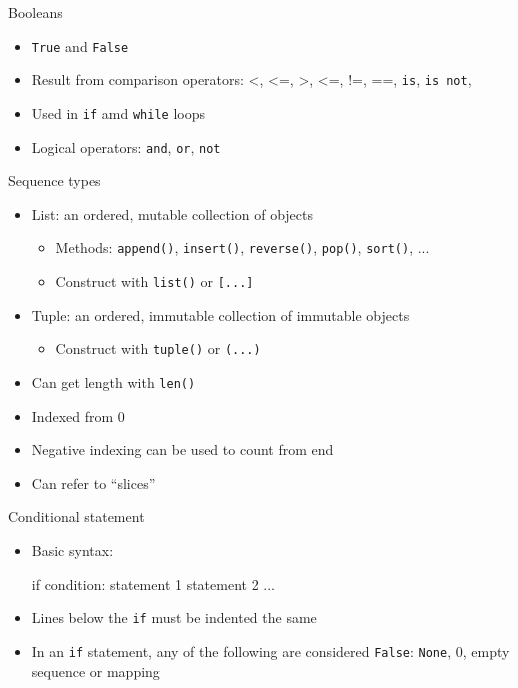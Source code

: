 \documentclass[noamssymb,svgnames]{beamer}
\begin{document}
\begin{frame}{Booleans}
  \begin{itemize}
  \item \texttt{True} and \texttt{False}
  \item Result from comparison operators: <, <=, >, <=, !=, ==, \texttt{is},
    \texttt{is not},
  \item Used in \texttt{if} amd \texttt{while} loops
  \item Logical operators: \texttt{and}, \texttt{or}, \texttt{not}
  \end{itemize}
\end{frame}

\begin{frame}{Sequence types}
  \begin{itemize}
  \item List: an ordered, mutable collection of objects
    \begin{itemize}
    \item Methods: \texttt{append()}, \texttt{insert()}, \texttt{reverse()},
      \texttt{pop()}, \texttt{sort()}, ...
    \item Construct with \texttt{list()} or \texttt{[...]}
    \end{itemize}
  \item Tuple: an ordered, immutable collection of immutable objects
    \begin{itemize}
    \item Construct with \texttt{tuple()} or \texttt{(...)}
    \end{itemize}
  \item Can get length with \texttt{len()}
  \item Indexed from 0
  \item Negative indexing can be used to count from end
  \item Can refer to ``slices''
  \end{itemize}
\end{frame}

\begin{frame}[fragile]{Conditional statement}
  \begin{itemize}
  \item Basic syntax:
    \begin{python}
        if condition:
            statement 1
            statement 2
            ...
    \end{python}
  \item Lines below the \texttt{if} must be indented the same
  \item In an \texttt{if} statement, any of the following are considered
    \texttt{False}: \texttt{None}, 0, empty sequence or mapping
  \end{itemize}
\end{frame}
\end{document}
